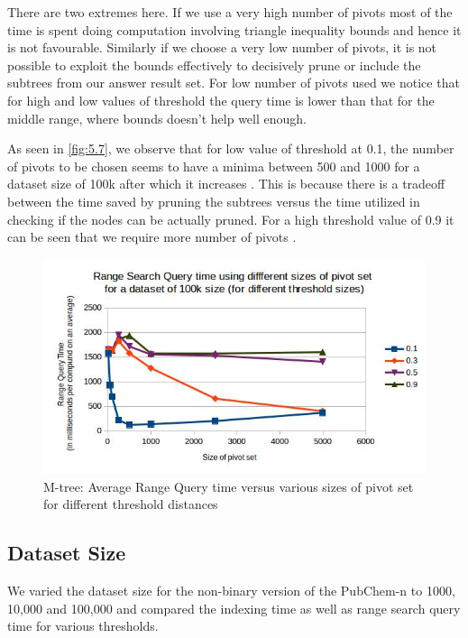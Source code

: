There are two extremes here. If we use a very high number of pivots most of the time is spent doing computation involving triangle inequality bounds and hence it is not favourable. Similarly if we choose a very low number of pivots, it is not possible to exploit the bounds effectively to decisively prune or include the subtrees from our answer result set. For low number of pivots used we notice that for high and low values of threshold the query time is lower than that for the middle range, where bounds doesn't help well enough.


As seen in \autoref{fig:5.7}, we observe that for low value of threshold at 0.1, the number of pivots to be chosen seems to have a minima between 500 and 1000 for a dataset size of 100k after which it increases . This is because there is a tradeoff between the time saved by pruning the subtrees versus the time utilized in checking if the nodes can be actually pruned.  For a high threshold value of 0.9 it can be seen that we require more number of pivots . 

\begin{figure}[ht!]	
\centering
\includegraphics[width=1 \columnwidth]{img/image5.jpg}
\caption{M-tree: Average Range Query time versus various sizes of pivot set for different threshold distances}
\label{fig:5.7}
\end{figure}



\subsection{Dataset Size}
We varied the dataset size for the non-binary version of the PubChem-n to 1000, 10,000 and 100,000 and compared the indexing time as well as range search query time for various thresholds. 


